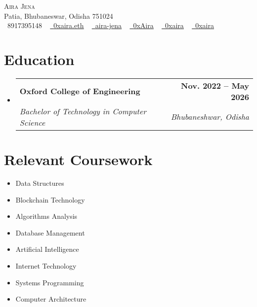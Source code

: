 \documentclass[letterpaper,11pt]{article}
\makeatletter
\newcommand{\resumeSubheading}[4]{
  \vspace{-2pt}\item
    \begin{tabular*}{1.0\textwidth}[t]{l@{\extracolsep{\fill}}r}
      \textbf{#1} & \textbf{\small #2} \\
      \textit{\small#3} & \textit{\small #4} \\
    \end{tabular*}\vspace{-7pt}
}
\newcommand{\resumeSubHeadingListStart}{\begin{itemize}[leftmargin=0.0in, label={}]}
\newcommand{\resumeSubHeadingListEnd}{\end{itemize}}
\makeatother
\begin{document}

\begin{center}
    {\Huge \scshape Aira Jena} \\ \vspace{1pt}
    Patia, Bhubaneswar, Odisha 751024 \\ \vspace{1pt}
    \small \raisebox{-0.1\height}\faPhone\ 8917395148 ~ \href{mailto:0xaira.eth@gmail.com}{\raisebox{-0.2\height}\faEnvelope\  \underline{0xaira.eth}} ~ 
    \href{https://linkedin.com/in/aira-jena/}{\raisebox{-0.2\height}\faLinkedin\ \underline{aira-jena}}  ~
    \href{https://linkedin.com/in/aira-jena/}{\raisebox{-0.2\height}\faTwitter\ \underline{0xAira}} ~
    \href{https://github.com/0xaira}
    {\raisebox{-0.2\height}\faGithub\ \underline{0xaira}} ~
    \href{https://github.com/0xaira}
    {\raisebox{-0.2\height}\faGlobe\ \underline{0xaira}}
    \vspace{-8pt}
\end{center}
\section{Education}
  \resumeSubHeadingListStart
    \resumeSubheading
      {Oxford College of Engineering}{Nov. 2022 -- May 2026}
      {Bachelor of Technology in Computer Science}{Bhubaneshwar, Odisha}
  \resumeSubHeadingListEnd

\section{Relevant Coursework}
        \begin{multicols}{4}
            \begin{itemize}[itemsep=-5pt, parsep=3pt]
                \item\small Data Structures
                \item Blockchain Technology
                \item Algorithms Analysis
                \item Database Management
                \item Artificial Intelligence
                \item Internet Technology
                \item Systems Programming
                \item Computer Architecture
            \end{itemize}
        \end{multicols}
        \vspace*{2.0\multicolsep}
\end{document}
